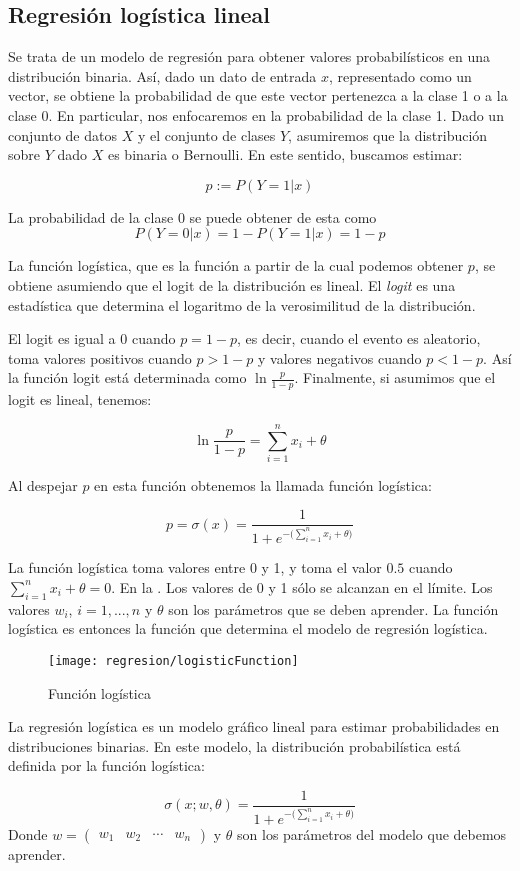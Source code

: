 \subsection{Regresión logística lineal}

Se trata de un modelo de regresión para obtener valores probabilísticos en una distribución binaria. Así, dado un dato de entrada $x$, representado como un vector, se obtiene la probabilidad de que este vector pertenezca a la clase 1 o a la clase 0. En particular, nos enfocaremos en la probabilidad de la clase 1. Dado un conjunto de datos $X$ y el conjunto de clases $Y$, asumiremos que la distribución sobre $Y$ dado $X$ es binaria o Bernoulli. En este sentido, buscamos estimar:

$$p := P(Y=1|x)$$

La probabilidad de la clase 0 se puede obtener de esta como $$P(Y=0|x) = 1-P(Y=1|x) = 1-p$$ {\color{gray}La función logística, que es la función a partir de la cual podemos obtener $p$, se obtiene asumiendo que el logit de la distribución es lineal. El \emph{logit} es una estadística que determina el logaritmo de la verosimilitud de la distribución.

El logit es igual a 0 cuando $ p = 1-p$, es decir, cuando el evento es aleatorio, toma valores positivos cuando $p > 1-p$ y valores negativos cuando $p < 1-p$. Así la función logit está determinada como $\ln \frac{p}{1-p}$. Finalmente, si asumimos que el logit es lineal, tenemos:}

$$\ln \frac{p}{1-p} = \sum_{i=1}^n x_i + \theta$$

Al despejar $p$ en esta función obtenemos la llamada función logística:

$$p = \sigma(x) = \frac{1}{1 + e^{-\big(\sum_{i=1}^n x_i + \theta\big)}} $$

La función logística toma valores entre 0 y 1, y toma el valor $0.5$ cuando $\sum_{i=1}^n x_i + \theta = 0$. En la . Los valores de 0 y 1 sólo se alcanzan en el límite. Los valores $w_i$, $i=1,...,n$ y $\theta$ son los parámetros que se deben aprender. La función logística es entonces la función que determina el modelo de regresión logística.


\begin{figure}
 \centering
 \texttt{[image: regresion/logisticFunction]}
 \caption{Función logística}\label{Fig:Logistic}
\end{figure}




\begin{definition}
La regresión logística es un modelo gráfico lineal para estimar probabilidades en distribuciones binarias. En este modelo, la distribución probabilística está definida por la función logística:

$$ \sigma(x; w, \theta) = \frac{1}{1 + e^{-\big(\sum_{i=1}^n x_i + \theta\big)}} $$
Donde $w = \begin{pmatrix} w_1 & w_2 & \cdots & w_n \end{pmatrix}$ y $\theta$ son los parámetros del modelo que debemos aprender.
\end{definition}

